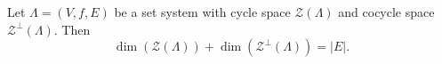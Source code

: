 Let $\Lambda = (V, f, E)$ be a set system with cycle space $\mathcal{Z}(\Lambda)$ and cocycle space $\mathcal{Z}^\perp(\Lambda)$. Then
$$\dim(\mathcal{Z}(\Lambda)) + \dim(\mathcal{Z}^\perp(\Lambda)) = |E|.$$
